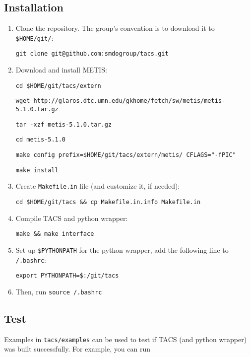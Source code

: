 \documentclass{article}
\begin{document}
\subsection{Installation}

\begin{enumerate}
    \item Clone the repository. The group's convention is to download it to
    \texttt{\$HOME/git/}:

    \texttt{git clone git@github.com:smdogroup/tacs.git}

    \item Download and install METIS:

    \texttt{cd \$HOME/git/tacs/extern}

    \texttt{wget http://glaros.dtc.umn.edu/gkhome/fetch/sw/metis/metis-5.1.0.tar.gz}

    \texttt{tar -xzf metis-5.1.0.tar.gz}

    \texttt{cd metis-5.1.0}

    \texttt{make config prefix=\$HOME/git/tacs/extern/metis/ CFLAGS="-fPIC"}

    \texttt{make install}

    \item Create \texttt{Makefile.in} file (and customize it, if needed):

    \texttt{cd \$HOME/git/tacs \&\& cp Makefile.in.info Makefile.in}

    \item Compile TACS and python wrapper:

    \texttt{make \&\& make interface}

    \item Set up \texttt{\$PYTHONPATH} for the python wrapper, add the following line to \texttt{\texttildelow/.bashrc}:

    \texttt{export PYTHONPATH=\$:\texttildelow/git/tacs}

    \item Then, run \texttt{source \texttildelow/.bashrc}

\end{enumerate}

\subsection{Test}

Examples in \texttt{tacs/examples} can be used to test if TACS (and python wrapper) was built
successfully. For example, you can run
\end{document}
